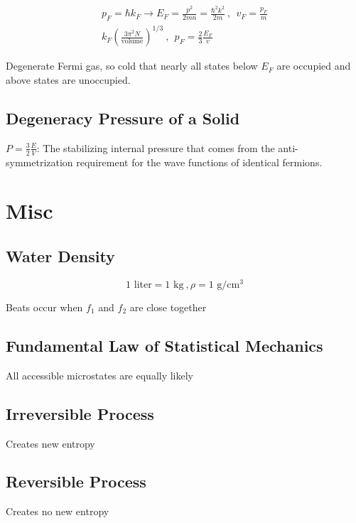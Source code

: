 \documentclass[10pt,a4paper]{article}
\begin{document}
\begin{align}
 p_F = \hbar k_F \rightarrow E_F = \frac{p^2}{2mn} = \frac{\hbar^2k^2}{2m}~,~~v_F = \frac{p_F}{m}\\
k_F \left( \frac{3\pi^2N}{\textrm{volume}} \right)^{1/3}~,~~p_F = \frac{2}{3}\frac{E_F}{v}
\end{align}

Degenerate Fermi gas, so cold that nearly all states below $E_F$ are occupied and above states are unoccupied. 

\subsection{Degeneracy Pressure of a Solid}
$P = \frac{3}{2}\frac{E}{V}$: The stabilizing internal pressure that comes from the anti-symmetrization requirement for the wave functions of identical fermions.


\section{Misc}
\subsection{Water Density}
\begin{equation}
 1 \textrm{ liter} = 1 \textrm{ kg}~, \rho = 1 \textrm{ g}/ \textrm{cm}^3
\end{equation}

Beats occur when $f_1$ and $f_2$ are close together

\subsection{Fundamental Law of Statistical Mechanics}
All accessible microstates are equally likely

\subsection{Irreversible Process}
Creates new entropy

\subsection{Reversible Process}
Creates no new entropy
\end{document}
